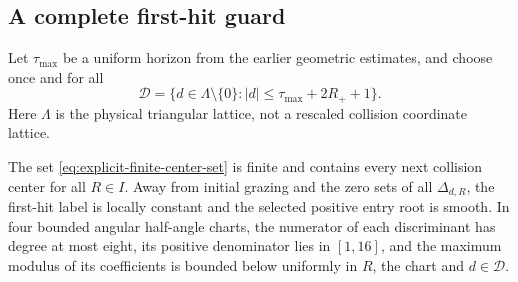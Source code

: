 \subsection{A complete first-hit guard}
Let $\tau_{\max}$ be a uniform horizon from the earlier geometric
estimates, and choose once and for all
\begin{equation}\label{eq:explicit-finite-center-set}
 \mathcal D=\{d\in\Lambda\setminus\{0\}:
                        |d|\le\tau_{\max}+2R_++1\}.
\end{equation}
Here $\Lambda$ is the physical triangular lattice, not a rescaled
collision coordinate lattice.

\begin{lemma}
\label{lem:complete-first-hit-guard}
The set \eqref{eq:explicit-finite-center-set} is finite and contains
every next collision center for all $R\in I$. Away from initial grazing
and the zero sets of all $\Delta_{d,R}$, the first-hit label is locally
constant and the selected positive entry root is smooth. In four bounded
angular half-angle charts, the numerator of each discriminant has degree
at most eight, its positive denominator lies in $[1,16]$, and the maximum
modulus of its coefficients is bounded below uniformly in $R$, the
chart and $d\in\mathcal D$.
\end{lemma}
